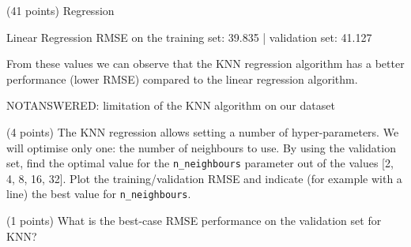 \documentclass[12pt]{article}
\begin{document}
\begin{question}{\label{Q_LR_BA}(41 points) Regression}
\begin{subquestion}
{Linear Regression RMSE on the training set: 39.835 | validation set: 41.127

From these values we can observe that the KNN regression algorithm has a better performance (lower RMSE) compared to the linear regression algorithm.

NOTANSWERED: limitation of the KNN algorithm on our dataset
}



\end{subquestion}

\begin{subquestion}{(4 points) The KNN regression allows setting a number of hyper-parameters. We will optimise only one: the number of neighbours to use. By using the validation set, find the optimal value for the \texttt{n\_neighbours} parameter out of the values [2, 4, 8, 16, 32]. Plot the training/validation RMSE and indicate (for example with a line) the best value for \texttt{n\_neighbours}.}






\end{subquestion}

\begin{subquestion}{(1 points) What is the best-case RMSE performance on the validation set for KNN?}




\end{subquestion}
\end{question}
\end{document}

